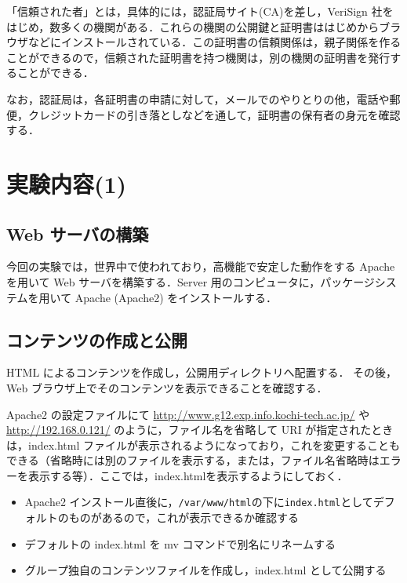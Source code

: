 「信頼された者」とは，具体的には，認証局サイト(CA)を差し，VeriSign 社を
はじめ，数多くの機関がある．これらの機関の公開鍵と証明書ははじめからブラ
ウザなどにインストールされている．この証明書の信頼関係は，親子関係を作る
ことができるので，信頼された証明書を持つ機関は，別の機関の証明書を発行す
ることができる．

なお，認証局は，各証明書の申請に対して，メールでのやりとりの他，電話や郵
便，クレジットカードの引き落としなどを通して，証明書の保有者の身元を確認
する．

\section{実験内容(1)}

\subsection*{Web サーバの構築}

今回の実験では，世界中で使われており，高機能で安定した動作をする Apache 
を用いて Web サーバを構築する．Server 用のコンピュータに，パッケージシス
テムを用いて Apache (Apache2) をインストールする．

\subsection*{コンテンツの作成と公開}

HTML によるコンテンツを作成し，公開用ディレクトリへ配置する．
その後，Web ブラウザ上でそのコンテンツを表示できることを確認する．

Apache2 の設定ファイルにて \url{http://www.g12.exp.info.kochi-tech.ac.jp/} や \url{http://192.168.0.121/} のように，ファイル名を省略して URI が指定されたときは，index.html ファイルが表示されるようになっており，これを変更することもできる（省略時には別のファイルを表示する，または，ファイル名省略時はエラーを表示する等）．ここでは，index.htmlを表示するようにしておく．

\begin{itemize}
 \item Apache2 インストール直後に，\texttt{/var/www/html}の下に\texttt{index.html}としてデフォルトのものがあるので，これが表示できるか確認する
 \item デフォルトの index.html を mv コマンドで別名にリネームする
 \item グループ独自のコンテンツファイルを作成し，index.html として公開する
\end{itemize}


